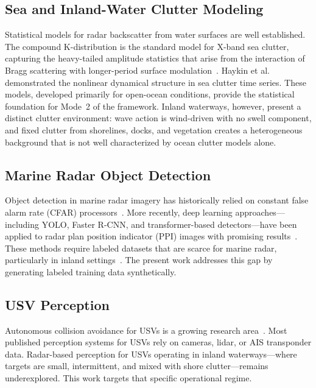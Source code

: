 \documentclass[conf]{new-aiaa}
\begin{document}
\subsection{Sea and Inland-Water Clutter Modeling}

Statistical models for radar backscatter from water surfaces are well established. The compound K-distribution is the standard model for X-band sea clutter, capturing the heavy-tailed amplitude statistics that arise from the interaction of Bragg scattering with longer-period surface modulation~\cite{ward2013sea, watts1987radar, farina1997high}. Haykin et al.~\cite{haykin2002uncovering} demonstrated the nonlinear dynamical structure in sea clutter time series. These models, developed primarily for open-ocean conditions, provide the statistical foundation for Mode~2 of the framework. Inland waterways, however, present a distinct clutter environment: wave action is wind-driven with no swell component, and fixed clutter from shorelines, docks, and vegetation creates a heterogeneous background that is not well characterized by ocean clutter models alone.

\subsection{Marine Radar Object Detection}

Object detection in marine radar imagery has historically relied on constant false alarm rate (CFAR) processors~\cite{rohling1983radar, gandhi1988analysis}. More recently, deep learning approaches---including YOLO, Faster R-CNN, and transformer-based detectors---have been applied to radar plan position indicator (PPI) images with promising results~\cite{prasad2017object}. These methods require labeled datasets that are scarce for marine radar, particularly in inland settings~\cite{cheng2021robust}. The present work addresses this gap by generating labeled training data synthetically.

\subsection{USV Perception}

Autonomous collision avoidance for USVs is a growing research area~\cite{han2023maritime}. Most published perception systems for USVs rely on cameras, lidar, or AIS transponder data. Radar-based perception for USVs operating in inland waterways---where targets are small, intermittent, and mixed with shore clutter---remains underexplored. This work targets that specific operational regime.
\end{document}
